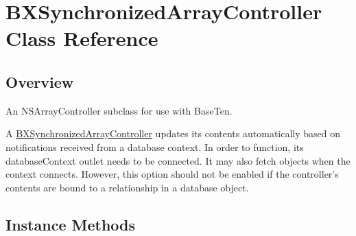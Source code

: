 \hypertarget{interface_b_x_synchronized_array_controller}{}\section{B\+X\+Synchronized\+Array\+Controller Class Reference}
\label{interface_b_x_synchronized_array_controller}


\subsection{Overview}
An N\+S\+Array\+Controller subclass for use with Base\+Ten. 

A \hyperlink{interface_b_x_synchronized_array_controller}{B\+X\+Synchronized\+Array\+Controller} updates its contents automatically based on notifications received from a database context. In order to function, its database\+Context outlet needs to be connected. It may also fetch objects when the context connects. However, this option should not be enabled if the controller's contents are bound to a relationship in a database object. \subsection*{Instance Methods}
